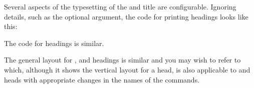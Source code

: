     Several aspects of the typesetting of the \cmd{\book} and \cmd{\part} 
title are configurable. Ignoring details, such as the optional argument,
the code for printing \cmd{\part} headings looks like this:
\begin{lcode}
\newcommand{\part}[1]{%
  \cleardoublepage         %
  \thispagestyle{part}     %
  \beforepartskip          %
  \printpartname\partnamenum\printpartnum
  \midpartskip             %
  \printparttitle{#1}      %
  \partpageend}            %
\newcommand{\partpageend}{%
  \afterpartskip
  }
\end{lcode}
The code for \cmd{\book} headings is similar.

    The general layout for \cmd{\book}, \cmd{\part} and \cmd{\chapter} headings
is similar and you may wish to refer to  which, although
it shows the vertical layout for a  head, is also applicable
to \cmd{\book} and \cmd{\part} heads with appropriate changes in the
names of the commands.


